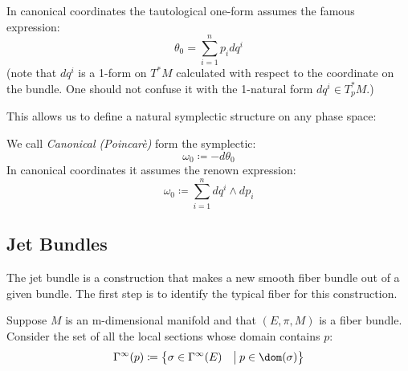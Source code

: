 \documentclass[Main]{subfiles}
\begin{document}
						In canonical coordinates the tautological one-form assumes the famous expression:
						\begin{displaymath}
							\theta_0 = \sum_{i=1}^n {p_i} d q^i
						\end{displaymath}
						(note that $d q^i$ is a 1-form on $T^*M$ calculated with respect to the coordinate on the bundle. One should not confuse it with the 1-natural form $d q^i \in T^*_p M$.)

	
					This allows us to define a natural symplectic structure on any phase space:
					\begin{definition}\label{Def:NatSymForm}
						We call \emph{Canonical (Poincarè)} form the symplectic:
						\begin{displaymath}
							\omega_0 \coloneqq -d \theta_0
						\end{displaymath}
						In canonical coordinates it assumes the renown expression:
						\begin{displaymath}
							\omega_0 \coloneqq \sum_{i=1}^n  d q^i \wedge d p_i
						\end{displaymath}
					\end{definition}
					
		\subsection{Jet Bundles}\label{Sect:JetBundles}
			The jet bundle is a %
			construction that makes a new smooth fiber bundle out of a given bundle. The first step is to identify the typical fiber for this construction.

			Suppose $M$ is an m-dimensional manifold and that $(E, \pi, M)$ is a fiber bundle. 
			Consider the set of all the local sections whose domain contains $p$:
			\begin{displaymath}
				\Gamma^\infty (p) \coloneqq \big\{ \sigma \in \Gamma^\infty(E) \quad \big\vert\:  p \in \dom(\sigma)  \big\}
			\end{displaymath}
\end{document}
